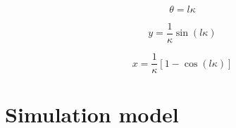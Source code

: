 \begin{equation}
    \theta = l \kappa
\end{equation}


\begin{equation}
    y = \frac{1}{\kappa}\sin(l \kappa)
\end{equation}

\begin{equation}
    x = \frac{1}{\kappa}[1-\cos(l \kappa)]
\end{equation}




\section{Simulation model}








